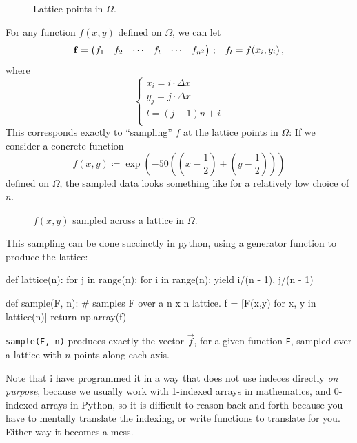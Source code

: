\documentclass[12pt]{article}
\begin{document}
\begin{multicols*}{2}
    \begin{figure}[H]
        \centering
        
        \caption{
            Lattice points in $\Omega$.
        }
        \label{fig:omega}
    \end{figure}\noindent
    For any function $f(x, y)$ defined on $\Omega$, we can let
    \[
        \vec f = \begin{pmatrix}
            f_1 & f_2 & \cdots & f_l & \cdots & f_{n^2}
        \end{pmatrix}
        \,\text; \quad
        f_l = f(x_i, y_i) \,\text,
    \]
    where
    \[
        \left\{\begin{array}{l}
            x_i = i \cdot \Delta x \\
            y_j = j \cdot \Delta x \\
            l = \left(j - 1\right)n + i \\
        \end{array}\right.
    \]
    This corresponds exactly to ``sampling'' $f$ at the lattice points in $\Omega$:
    If we consider a concrete function
    \[
        f(x, y) \coloneqq \exp{\left(
            -50 \left(
                \left(x - \frac{1}{2}\right)
                + \left(y - \frac{1}{2}\right)
            \right)
        \right)}
    \]
    defined on $\Omega$, the sampled data looks something like
     for a relatively low choice of $n$.
    \begin{figure}[H]
        \centering
        
        \caption{
            $f(x, y)$ sampled across a lattice in $\Omega$.
        }
        \label{fig:sample}
    \end{figure}\noindent
    This sampling can be done succinctly in python, using
    a generator function to produce the lattice:
    \begin{python}[
        caption={Program to sample functions over lattices}
   ]
def lattice(n):
    for j in range(n):
        for i in range(n):
            yield i/(n - 1), j/(n - 1)

def sample(F, n):
    # samples F over a n x n lattice.
    f = [F(x,y) for x, y in lattice(n)]
    return np.array(f)
    \end{python}
    {\tt sample(F, n)} produces exactly the vector $\vec f$,
    for a given function {\tt F}, sampled over a lattice
    with $n$ points along each axis.

    {\sc Note that} i have programmed it in a way that does
    not use indeces directly {\em on purpose}, because we
    usually work with 1-indexed arrays in mathematics,
    and 0-indexed arrays in Python, so it is difficult
    to reason back and forth because you have to mentally
    translate the indexing, or write functions to
    translate for you. Either way it becomes a mess.


\end{multicols*}
\end{document}
